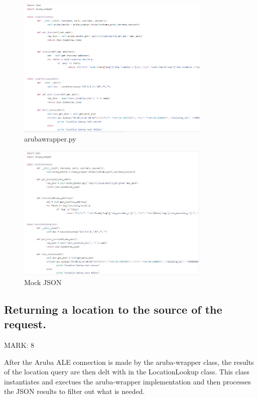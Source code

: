 \documentclass{article}
\begin{document}
\begin{figure}[ht]
  \includegraphics[width=350px]{Images/getLoc.PNG}
  \caption{aruba\textunderscore wrapper.py}
  \label{arubawrapper.py}
\end{figure}
\begin{figure}[ht]
  \includegraphics[width=350px]{Images/LocLookup.JPG}
  \caption{Mock JSON}

\label{Mock JSON}
\end{figure}


\subsection{Returning a location to the source of the request.}
\begin{flushleft}
MARK: 8
\end{flushleft}

\begin{flushleft}
After the Aruba ALE connection is made by the aruba-wrapper class, the results of the location query are then delt with in the LocationLookup class. This class instantiates and exectues the aruba-wrapper implementation and then processes the JSON results to filter out what is needed. 
\end{flushleft}
\end{document}
